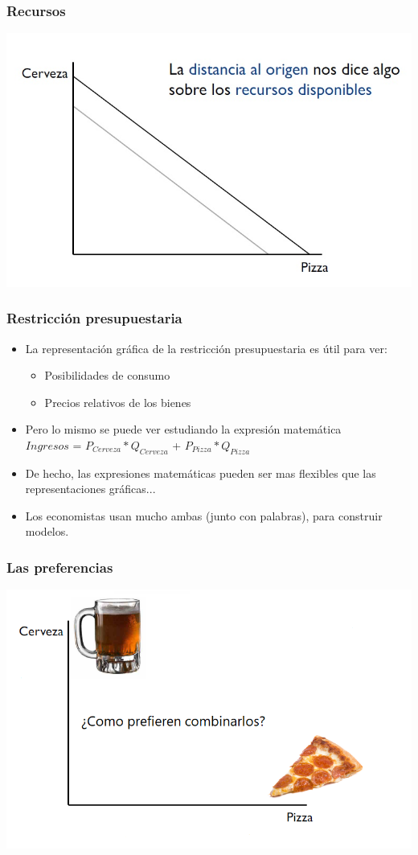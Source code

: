 \documentclass{beamer}
\begin{document}
\begin{frame}
\frametitle{ Recursos}
\centering
\includegraphics[scale=0.55]{Figures/Tema_02.10_rp8.jpg}
\end{frame}

\begin{frame}
\frametitle{ Restricción presupuestaria}
\begin{itemize}
    \item La representación gráfica de la restricción presupuestaria es útil para ver:
    \begin{itemize}
        \item Posibilidades de consumo
        \item Precios relativos de los bienes
    \end{itemize}
    \item Pero lo mismo se puede ver estudiando la expresión matemática \\
    $Ingresos$ = $P_{Cerveza} * Q_{Cerveza}$ + $P_{Pizza} * Q_{Pizza}$
    \\
    \item De hecho, las expresiones matemáticas pueden ser mas flexibles que las representaciones gráficas...
    \item Los economistas usan mucho ambas (junto con palabras), para construir modelos.
\end{itemize} 
\end{frame}


\begin{frame}
\frametitle{ Las preferencias}
\centering
\includegraphics[scale=0.55]{Figures/Tema_02.11_rp9.png}
\end{frame}
\end{document}

